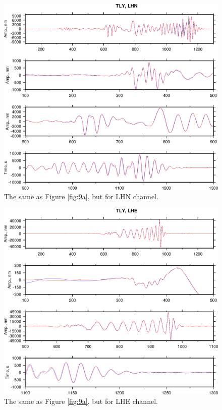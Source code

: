 \begin{figure}
\begin{center}
\includegraphics[width=7 in]{Figures/FigsTLYLHN}
\caption{ The same as Figure \ref{fig:9a}, but for LHN channel.}
\label{fig:10a}
\end{center}
\end{figure}

\begin{figure}
\begin{center}
\includegraphics[width=7 in]{Figures/FigsTLYLHE}
\caption{ The same as Figure \ref{fig:9a}, but for LHE channel.}
\label{fig:11a}
\end{center}
\end{figure}

